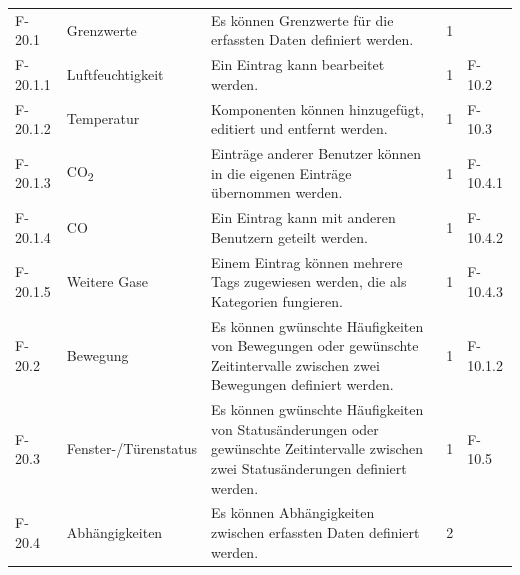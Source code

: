 \begin{tabularx}{\textwidth}{|l|X|X|l|l|}
    \hline
    F-20.1 & Grenzwerte & Es können Grenzwerte für die erfassten Daten definiert werden. & 1 & \\
    F-20.1.1 & Luftfeuchtigkeit & Ein Eintrag kann bearbeitet werden. & 1 & F-10.2\\
    F-20.1.2 & Temperatur & Komponenten können hinzugefügt, editiert und entfernt werden. & 1 & F-10.3\\
    F-20.1.3 & CO\textsubscript{2}& Einträge anderer Benutzer können in die eigenen Einträge übernommen werden. & 1 & F-10.4.1\\
    F-20.1.4 & CO & Ein Eintrag kann mit anderen Benutzern geteilt werden. & 1 & F-10.4.2\\
    F-20.1.5 & Weitere Gase & Einem Eintrag können mehrere Tags zugewiesen werden, die als Kategorien fungieren. & 1 & F-10.4.3\\
    F-20.2 & Bewegung & Es können gwünschte Häufigkeiten von Bewegungen oder gewünschte Zeitintervalle zwischen zwei Bewegungen definiert werden. & 1 & F-10.1.2\\
    F-20.3 & Fenster-/Türenstatus & Es können gwünschte Häufigkeiten von Statusänderungen oder gewünschte Zeitintervalle zwischen zwei Statusänderungen definiert werden. & 1 & F-10.5\\
    F-20.4 & Abhängigkeiten & Es können Abhängigkeiten zwischen erfassten Daten definiert werden. & 2 & \\


\end{tabularx}
